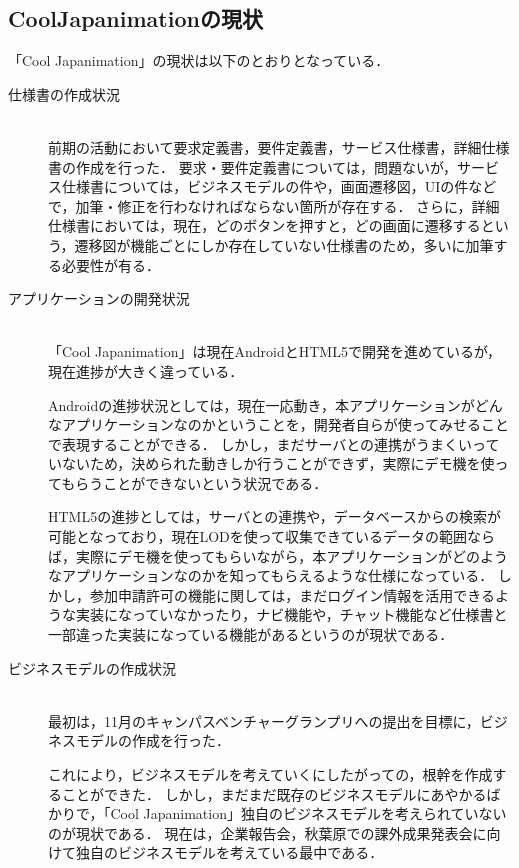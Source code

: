 \subsection{CoolJapanimationの現状}

「Cool Japanimation」の現状は以下のとおりとなっている．

\begin{description}

\item[仕様書の作成状況]\mbox{}\\ 
前期の活動において要求定義書，要件定義書，サービス仕様書，詳細仕様書の作成を行った．
要求・要件定義書については，問題ないが，サービス仕様書については，ビジネスモデルの件や，画面遷移図，UIの件などで，加筆・修正を行わなければならない箇所が存在する．
さらに，詳細仕様書においては，現在，どのボタンを押すと，どの画面に遷移するという，遷移図が機能ごとにしか存在していない仕様書のため，多いに加筆する必要性が有る．

\item[アプリケーションの開発状況]\mbox{}\\ 
「Cool Japanimation」は現在AndroidとHTML5で開発を進めているが，現在進捗が大きく違っている．\par
Androidの進捗状況としては，現在一応動き，本アプリケーションがどんなアプリケーションなのかということを，開発者自らが使ってみせることで表現することができる．
しかし，まだサーバとの連携がうまくいっていないため，決められた動きしか行うことができず，実際にデモ機を使ってもらうことができないという状況である．\par
HTML5の進捗としては，サーバとの連携や，データベースからの検索が可能となっており，現在LODを使って収集できているデータの範囲ならば，実際にデモ機を使ってもらいながら，本アプリケーションがどのようなアプリケーションなのかを知ってもらえるような仕様になっている．
しかし，参加申請許可の機能に関しては，まだログイン情報を活用できるような実装になっていなかったり，ナビ機能や，チャット機能など仕様書と一部違った実装になっている機能があるというのが現状である．

\item[ビジネスモデルの作成状況]\mbox{}\\ 
最初は，11月のキャンパスベンチャーグランプリへの提出を目標に，ビジネスモデルの作成を行った．
\par
これにより，ビジネスモデルを考えていくにしたがっての，根幹を作成することができた．
しかし，まだまだ既存のビジネスモデルにあやかるばかりで，「Cool Japanimation」独自のビジネスモデルを考えられていないのが現状である．
現在は，企業報告会，秋葉原での課外成果発表会に向けて独自のビジネスモデルを考えている最中である．


\end{description}
